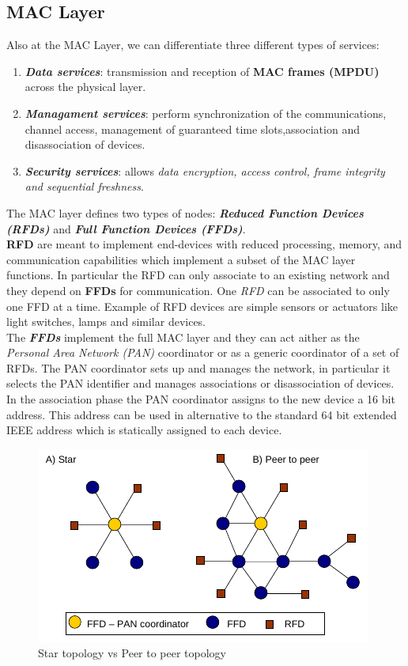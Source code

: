 \documentclass[10pt,a4paper]{report}
\theoremstyle{definition}
\begin{document}
\subsection{MAC Layer}\label{sec:mac-layer}
Also at the MAC Layer, we can differentiate three different types of services:
\begin{enumerate}
	\item 
	\textit{\textbf{Data services}}: transmission and reception of \textbf{MAC frames (MPDU)} across the physical layer.
	\item 
	\textit{\textbf{Managament services}}: perform synchronization of the communications, channel access, management of guaranteed time slots,association and disassociation of devices.
	\item 
	\textit{\textbf{Security services}}: allows \textit{data encryption, access control, frame integrity and sequential freshness}.
\end{enumerate}
The MAC layer defines two types of nodes: \textit{\textbf{Reduced Function Devices (RFDs)}} and \textit{\textbf{Full Function Devices (FFDs)}}.\\
\textbf{RFD} are meant to implement end-devices with reduced processing, memory, and communication capabilities which implement a subset of the MAC layer functions. In particular the RFD can only associate to an existing network and they depend on \textbf{FFDs} for communication. One \textit{RFD} can be associated to only one FFD at a time. Example of RFD devices are simple sensors or actuators like light switches,
lamps and similar devices.\\
The \textit{\textbf{FFDs}} implement the full MAC layer and they can act aither as the \textit{Personal Area Network (PAN)} coordinator or as a generic coordinator of a set of RFDs. The PAN coordinator sets up and manages the network, in particular it selects the PAN identifier and manages associations or disassociation of devices.
In the association phase the PAN coordinator assigns to the new device a 16 bit address. This address can be used in alternative to the standard 64 bit extended IEEE address which is statically assigned to each device.

\begin{figure}[h!]
	\centering\includegraphics[scale=0.50]{images/Pasted image 20230409100959.png}
	\caption{Star topology vs Peer to peer topology}
	\label{802-network-top}
\end{figure}
\end{document}
